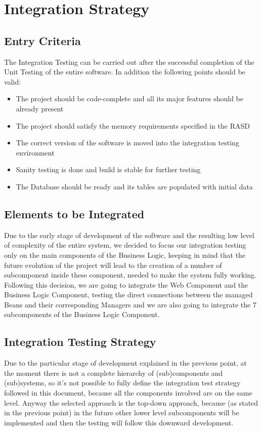 \chapter{Integration Strategy} \label{chap2}

\section{Entry Criteria}
The Integration Testing can be carried out after the successful completion of the Unit Testing of the entire software. In addition the following points should be valid:

\begin{itemize}
	\item The project should be code-complete and all its major features should be already present
	\item The project should satisfy the memory requirements specified in the RASD
	\item The correct version of the software is moved into the integration testing environment
	\item Sanity testing is done and build is stable for further testing
	\item The Database should be ready and its tables are populated with initial data
\end{itemize}

\section{Elements to be Integrated}
Due to the early stage of development of the software and the resulting low level of complexity of the entire system, we decided to focus our integration testing only on the main components of the Business Logic, keeping in mind that the future evolution of the project will lead to the creation of a number of subcomponent inside these component, needed to make the system fully working. Following this decision, we are going to integrate the Web Component and the Business Logic Component, testing the direct connections between the managed Beans and their corresponding Managers and we are also going to integrate the 7 subcomponents of the Business Logic Component.

\section{Integration Testing Strategy}
Due to the particular stage of development explained in the previous point, at the moment there is not a complete hierarchy of (sub)components and (sub)systems, so it's not possible to fully define the integration test strategy followed in this document, because all the components involved are on the same level. Anyway the selected approach is the top-down approach, because (as stated in the previous point) in the future other lower level subcomponents will be implemented and then the testing will follow this downward development.

